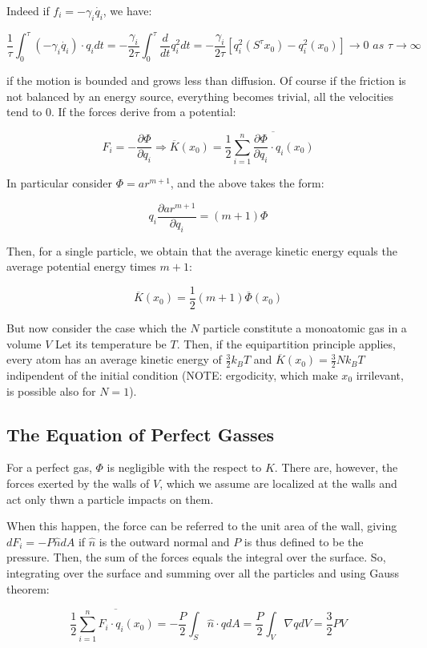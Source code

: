 \documentclass{article}
\begin{document}
Indeed if $f_i=-\gamma_i \dot{q_i}$, we have:

$$ \frac{1}{\tau} \int_{0}^{\tau} (-\gamma_i \dot{q_i} ) \cdot q_i dt = -\frac{\gamma_i}{2 \tau} \int_{0}^{\tau} \frac{d}{dt} q_i^2 dt = -\frac{\gamma_i}{2 \tau}[q_i^2(S^{\tau} x_0)-q_i^2(x_0)] \to 0 \textit{ as } \tau \to \infty$$

if the motion is bounded and grows less than diffusion. Of course if the friction is not balanced by an energy source, everything becomes trivial, all the velocities tend to 0. If the forces derive from a potential:

$$F_i = -\frac{\partial \Phi}{\partial q_i} \Rightarrow \overline{K}(x_0) =  \frac{1}{2} \overline{\sum_{i=1}^{n} \frac{\partial \Phi}{\partial q_i}   \cdot q_i(x_0)}$$

In particular consider $\Phi = a r^{m+1}$, and the above takes the form:

$$q_i \frac{\partial ar^{m+1}}{\partial q_i} = (m+1)\Phi$$

Then, for a single particle, we obtain that the average kinetic energy equals the average potential energy times $m+1$:

$$ \overline{K}(x_0) =  \frac{1}{2} (m+1)  \overline{\Phi}(x_0)$$

But now consider the case which the $N$ particle constitute a monoatomic gas in a volume $V$ Let its temperature be $T$. Then, if the equipartition principle applies, every atom has an average kinetic energy of $\frac{3}{2} k_B T$ and $ \overline{K}(x_0)  = \frac{3}{2} N k_B T$ indipendent of the initial condition (NOTE: ergodicity, which make $x_0$ irrilevant, is possible also for $N=1$).
\newline
\subsection{The Equation of Perfect Gasses}
For a perfect gas, $\Phi$ is negligible with the respect to $K$. There are, however, the forces exerted by the walls of $V$, which we assume are localized at the walls and act only thwn a particle impacts on them.

When this happen, the force can be referred to the unit area of the wall, giving $dF_i = - P \hat{n}dA$ if $\hat{n}$ is the outward normal and $P$ is thus defined to be the pressure. Then, the sum of the forces equals the integral over the surface. So, integrating over the surface and summing over all the particles and using Gauss theorem:

$$\frac{1}{2} \overline{\sum_{i=1}^{n} F_i  \cdot q_i(x_0)} = - \frac{P}{2} \int_{S} \hat{n} \cdot q dA = \frac{P}{2} \int_{V} \nabla q dV = \frac{3}{2} PV$$
\end{document}
